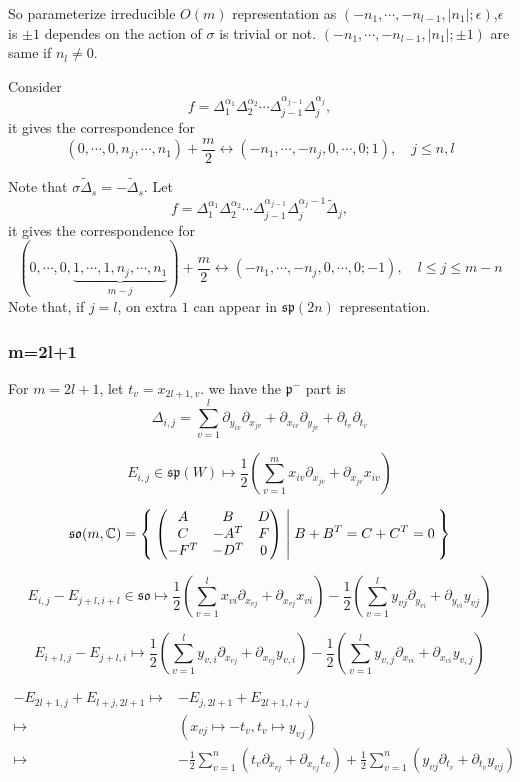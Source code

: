 \documentclass[12pt]{amsart}
\def\bC{{\mathbb{C}}}
\def\sp{{\mathfrak{sp}}}
\def\tDelta{\widetilde{\Delta}}
\def\aso{\mathfrak{so}}
\def\asp{\mathfrak{sp}}
\def\fpp{\mathfrak{p}}
\begin{document}
So parameterize irreducible $O(m)$ representation as 
$(-n_1, \cdots, -n_{l-1},|n_1|;\epsilon)$,$\epsilon$ is $\pm 1$ dependes on the action 
of $\sigma$ is trivial or not.
$(-n_1,\cdots, -n_{l-1},|n_1|;\pm 1)$ are same if $n_l\neq 0$.   


Consider 
\[
f = \Delta_1^{\alpha_1}\Delta_2^{\alpha_2} \cdots \Delta_{j-1}^{\alpha_{j-1}}
\Delta_j^{\alpha_j},
\]
it gives the correspondence for 
\[
(0,\cdots, 0, n_j, \cdots, n_1) + \frac{m}{2}
\leftrightarrow 
(-n_1, \cdots, -n_j, 0, \cdots, 0;1), \quad j\leq n, l
\]

Note that $\sigma \tDelta_s = -\tDelta_s$. Let
\[
f=\Delta_1^{\alpha_1}\Delta_2^{\alpha_2} \cdots \Delta_{j-1}^{\alpha_{j-1}}
\Delta_j^{\alpha_j-1}\tDelta_j,
\]
it gives the correspondence for 
\[
(0,\cdots, 0,\underbrace{1,\cdots, 1, n_j, \cdots, n_1}_{m-j}) + \frac{m}{2}
\leftrightarrow 
(-n_1, \cdots, -n_j, 0, \cdots, 0;-1), \quad l\leq j \leq m-n
\]
Note that, if $j=l$, on extra $1$ can appear in $\sp(2n)$ representation.

\subsubsection{m=2l+1}

For $m=2l+1$, let $t_v = x_{2l+1,v}$.  
we have 
the $\fpp^-$ part is 
\[
\Delta_{i,j} = 
\sum_{v=1}^l \partial_{y_{iv}}\partial_{x_{jv}}
+ \partial_{x_{iv}}\partial_{y_{jv}} + \partial_{t_v}\partial_{t_v}
\]


\[
E_{i,j} \in \asp(W)  
 \mapsto \frac{1}{2}(\sum_{v=1}^m x_{iv}\partial_{x_{jv}}+ \partial_{x_{jv}}x_{iv}) 
\]

\[
\aso(m,\bC) = \Set{
\begin{pmatrix} 
A & B & D\\
C & -A^T &F \\
-F^T& -D^T& 0
\end{pmatrix} |
B+B^T=C+C^T=0}
\]

\[
E_{i,j}-E_{j+l,i+l} \in \aso \mapsto 
 \frac{1}{2}(\sum_{v=1}^l x_{vi}\partial_{x_{vj}}+ \partial_{x_{vj}}x_{vi})
-\frac{1}{2}(\sum_{v=1}^l y_{vj}\partial_{y_{vi}}+ \partial_{y_{vi}}y_{vj})
\]

\[
E_{i+l,j}-E_{j+l,i}\mapsto 
 \frac{1}{2}(\sum_{v=1}^l y_{v,i}\partial_{x_{vj}}+\partial_{x_{vj}}y_{v,i})
-\frac{1}{2}(\sum_{v=1}^l y_{v,j}\partial_{x_{vi}}+\partial_{x_{vi}}y_{v,j})
\]

\[
\begin{split}
-E_{2l+1,j}+ E_{l+j,2l+1} \mapsto&
-E_{j,2l+1}+E_{2l+1,l+j} \\
\mapsto&
(x_{vj}\mapsto -t_v, t_v\mapsto y_{vj})\\
\mapsto&
-\frac{1}{2}\sum_{v=1}^n (t_v\partial_{x_{vj}}+\partial_{x_{vj}}t_v)
+\frac{1}{2}\sum_{v=1}^n (y_{vj}\partial_{t_v}+\partial_{t_v}y_{vj})
\end{split}
\]
\end{document}
